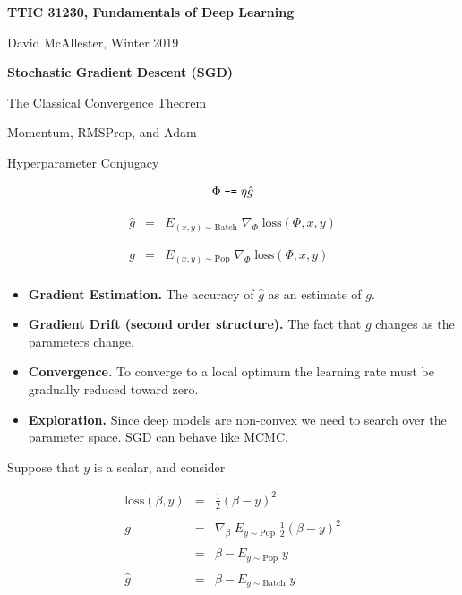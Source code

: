 


\newcommand{\solution}[1]{\bigskip {\bf Solution}: #1}



{\Huge
  \centerline{\bf TTIC 31230, Fundamentals of Deep Learning}
  \bigskip
  \centerline{David McAllester, Winter 2019}
  \vfill
  \centerline{\bf Stochastic Gradient Descent (SGD)}
  \vfill
  \centerline{The Classical Convergence Theorem}
  \vfill
  \centerline{Momentum, RMSProp, and Adam}
  \vfill
  \centerline{Hyperparameter Conjugacy}


$$\Phi \;\mbox{\tt -=}\; \eta \hat{g}$$

\vfill
\begin{eqnarray*}
  \hat{g} & = & E_{(x,y) \sim \mathrm{Batch}}\;\nabla_\Phi\;\mathrm{loss}(\Phi,x,y) \\
  \\
  \\
  g & = & E_{(x,y) \sim \mathrm{Pop}}\;\nabla_\Phi\;\mathrm{loss}(\Phi,x,y) \\
\end{eqnarray*}


\vfill
\begin{itemize}
\item {\bf Gradient Estimation.} The accuracy of $\hat{g}$ as an estimate of $g$.

  \vfill
\item {\bf Gradient Drift (second order structure).} The fact that $g$ changes as the parameters change.

  \vfill
\item {\bf Convergence.} To converge to a local optimum the learning rate must be gradually reduced toward zero.

  \vfill
  \item {\bf Exploration.} Since deep models are non-convex we need to search over the parameter space.  SGD can behave like MCMC.
\end{itemize}


Suppose that $y$ is a scalar, and consider

\begin{eqnarray*}
 \mathrm{loss}(\beta,y) & = & \frac{1}{2}(\beta - y)^2 \\
 \\
  g & = &  \nabla_\beta\;E_{y \sim \mathrm{Pop}}\;\frac{1}{2}(\beta - y)^2 \\
  \\
  & = & \beta - E_{y \sim \mathrm{Pop}} \; y \\
  \\
  \hat{g} & = &\beta - E_{y \sim \mathrm{Batch}} \;y
\end{eqnarray*}

}
